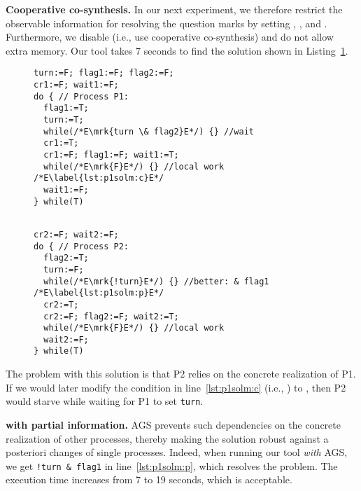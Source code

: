 \textbf{Cooperative co-synthesis.}
In our next experiment, we therefore restrict the observable information for 
resolving the question marks by setting
\mrk{\ctrl},
\mrk{\ctrl}, and 
\mrk{\ctrl}.  
Furthermore, we disable \ags (i.e., use cooperative co-synthesis) and do not 
allow extra memory. Our tool takes 7 seconds to find the solution shown in 
Listing~\ref{lst:p1solm}.
\begin{figure}[tb]
\label{lst:p1solm}
\vspace{-0.4cm}
\begin{minipage}{0.49\textwidth}
\begin{lstlisting}[firstnumber=0]
                    turn:=F; flag1:=F; flag2:=F;
cr1:=F; wait1:=F;
do { // Process P1:
  flag1:=T;
  turn:=T;
  while(/*E\mrk{turn \& flag2}E*/) {} //wait
  cr1:=T;
  cr1:=F; flag1:=F; wait1:=T;
  while(/*E\mrk{F}E*/) {} //local work /*E\label{lst:p1solm:c}E*/
  wait1:=F;
} while(T)
\end{lstlisting}
\end{minipage}
\hspace{0.1cm}
\begin{minipage}{0.49\textwidth}
\begin{lstlisting}[firstnumber=20]

cr2:=F; wait2:=F;
do { // Process P2:
  flag2:=T;
  turn:=F;
  while(/*E\mrk{!turn}E*/) {} //better: & flag1 /*E\label{lst:p1solm:p}E*/
  cr2:=T;
  cr2:=F; flag2:=F; wait2:=T;
  while(/*E\mrk{F}E*/) {} //local work
  wait2:=F;
} while(T)
\end{lstlisting}
\end{minipage}
\end{figure}
The problem with this solution is that P2 relies on the concrete realization of
P1. If we would later modify the condition in line~\ref{lst:p1solm:c} (i.e.,
\mrk{\ctrl}) to , then P2 would starve while waiting for P1 to 
set \texttt{turn}. 

\textbf{\ags with partial information.}
AGS prevents such dependencies on the concrete realization of other processes, 
thereby making the solution robust against a posteriori changes of single 
processes.  Indeed, when running our tool \emph{with} AGS, we get \texttt{!turn 
\& flag1} in line~\ref{lst:p1solm:p}, which resolves the problem.  The execution 
time increases from 7 to 19 seconds, which is acceptable.


